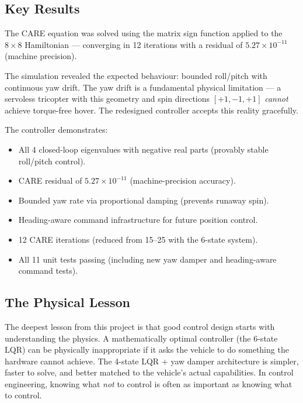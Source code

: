 \documentclass[12pt, a4paper]{article}
\begin{document}
\subsection{Key Results}

The CARE equation was solved using the matrix sign function applied to the $8 \times 8$ Hamiltonian --- converging in 12 iterations with a residual of $5.27 \times 10^{-11}$ (machine precision).

The simulation revealed the expected behaviour: bounded roll/pitch with continuous yaw drift.  The yaw drift is a fundamental physical limitation --- a servoless tricopter with this geometry and spin directions $[+1, -1, +1]$ \emph{cannot} achieve torque-free hover.  The redesigned controller accepts this reality gracefully.

The controller demonstrates:
\begin{itemize}
    \item All 4 closed-loop eigenvalues with negative real parts (provably stable roll/pitch control).
    \item CARE residual of $5.27 \times 10^{-11}$ (machine-precision accuracy).
    \item Bounded yaw rate via proportional damping (prevents runaway spin).
    \item Heading-aware command infrastructure for future position control.
    \item 12 CARE iterations (reduced from 15--25 with the 6-state system).
    \item All 11 unit tests passing (including new yaw damper and heading-aware command tests).
\end{itemize}

\subsection{The Physical Lesson}

The deepest lesson from this project is that good control design starts with understanding the physics.  A mathematically optimal controller (the 6-state LQR) can be physically inappropriate if it asks the vehicle to do something the hardware cannot achieve.  The 4-state LQR + yaw damper architecture is simpler, faster to solve, and better matched to the vehicle's actual capabilities.  In control engineering, knowing what \emph{not} to control is often as important as knowing what to control.
\end{document}
